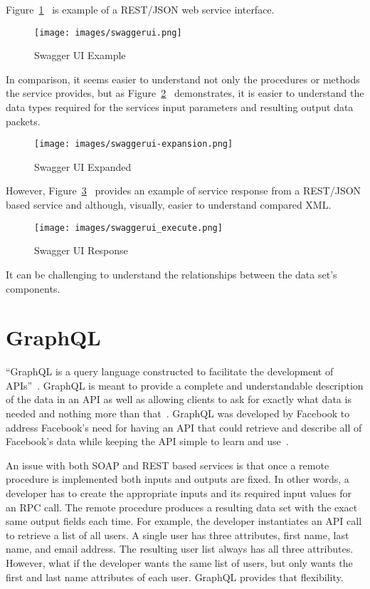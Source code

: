 Figure~\ref{f:swaggerui-example}~\cite{hid505swaggerio2018} is example of a REST/JSON web service
interface.  
\begin{figure}[!ht]
  \centering\texttt{[image: images/swaggerui.png]}
  \caption{Swagger UI Example}\label{f:swaggerui-example}
\end{figure}
In comparison, it seems easier to understand not only the procedures
or methods the service provides, but as Figure~\ref{f:swaggerui-expansion}~\cite{hid505swaggerio2018}
demonstrates, it is easier to understand the data types required for the services input
parameters and resulting output data packets.  
\begin{figure}[!ht]
  \centering\texttt{[image: images/swaggerui-expansion.png]}
  \caption{Swagger UI Expanded}\label{f:swaggerui-expansion}
\end{figure}
However, Figure~\ref{f:swagger-resp}~\cite{hid505swaggerresp2018} provides an example 
of service response from a REST/JSON based service and although, visually, 
easier to understand compared XML.  
\begin{figure}[!ht]
  \centering\texttt{[image: images/swaggerui\_execute.png]}
  \caption{Swagger UI Response}\label{f:swagger-resp}
\end{figure}
It can be challenging to understand the relationships between the data set's 
components.

\section{GraphQL}
``GraphQL is a query language constructed to facilitate the
development of APIs''~\cite{hid505FacebookGraphQL2018}.  GraphQL is
meant to provide a complete and understandable description of the data
in an API as well as allowing clients to ask for exactly what data is
needed and nothing more than that~\cite{hid505FacebookGraphQL2018}.
GraphQL was developed by Facebook to address Facebook's need for
having an API that could retrieve and describe all of Facebook's data
while keeping the API simple to learn and use~\cite{hid505Byron2015}.

An issue with both SOAP and REST based services is that once a remote
procedure is implemented both inputs and outputs are fixed.  In other words,
a developer has to create the appropriate inputs and its required input values
for an RPC call.  The remote procedure produces a resulting data set with the
exact same output fields each time.  For example, the developer instantiates an
API call to retrieve a list of all users.  A single user has three attributes,
first name, last name, and email address.  The resulting user list always has
all three attributes.  However, what if the developer wants the same list of
users, but only wants the first and last name attributes of each user.  GraphQL
provides that flexibility.

